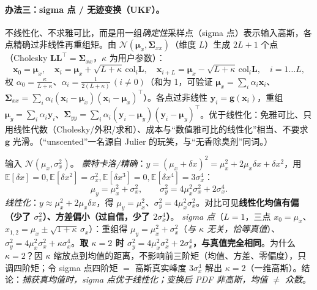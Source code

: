 \paragraph{办法三：sigma 点 / 无迹变换（UKF）。}
不线性化、不求雅可比，而是用一组\emph{确定性}采样点（sigma 点）表示输入高斯，各点精确过非线性再重组矩\cite{barfoot2024state}。由 $\mathcal{N}(\boldsymbol{\mu}_x,\boldsymbol{\Sigma}_{xx})$（维度 $L$）生成 $2L+1$ 个点（Cholesky $\mathbf{L}\mathbf{L}^\top=\boldsymbol{\Sigma}_{xx}$，$\kappa$ 为用户参数）：
\begin{equation}
  \mathbf{x}_0=\boldsymbol{\mu}_x,\quad
  \mathbf{x}_i=\boldsymbol{\mu}_x+\sqrt{L+\kappa}\,\mathrm{col}_i\mathbf{L},\quad
  \mathbf{x}_{i+L}=\boldsymbol{\mu}_x-\sqrt{L+\kappa}\,\mathrm{col}_i\mathbf{L},\quad i=1\dots L,
  \label{eq:sigma-points}
\end{equation}
权 $\alpha_0=\tfrac{\kappa}{L+\kappa}$、$\alpha_i=\tfrac{1}{2(L+\kappa)}\,(i\ne0)$（和为 1，可验证 $\boldsymbol{\mu}_x=\sum_i\alpha_i\mathbf{x}_i$、$\boldsymbol{\Sigma}_{xx}=\sum_i\alpha_i(\mathbf{x}_i-\boldsymbol{\mu}_x)(\mathbf{x}_i-\boldsymbol{\mu}_x)^\top$）。各点过非线性 $\mathbf{y}_i=\mathbf{g}(\mathbf{x}_i)$，重组 $\boldsymbol{\mu}_y=\sum_i\alpha_i\mathbf{y}_i$、$\boldsymbol{\Sigma}_{yy}=\sum_i\alpha_i(\mathbf{y}_i-\boldsymbol{\mu}_y)(\mathbf{y}_i-\boldsymbol{\mu}_y)^\top$。优于线性化：免雅可比、只用线性代数（Cholesky/外积/求和）、成本与“数值雅可比的线性化”相当、不要求 $\mathbf{g}$ 光滑。（“unscented”一名源自 Julier 的玩笑，与“无香除臭剂”同词\cite{barfoot2024state}。）

\begin{example}[$f(x)=x^2$：三法对比，看清线性化为何过自信]\label{ex:three-methods}
输入 $\mathcal{N}(\mu_x,\sigma_x^2)$。
\emph{蒙特卡洛/精确}：$y=(\mu_x+\delta x)^2=\mu_x^2+2\mu_x\delta x+\delta x^2$，用 $\mathbb{E}[\delta x]=0,\mathbb{E}[\delta x^2]=\sigma_x^2,\mathbb{E}[\delta x^3]=0,\mathbb{E}[\delta x^4]=3\sigma_x^4$：
\[
  \mu_y=\mu_x^2+\sigma_x^2,\qquad \sigma_y^2=4\mu_x^2\sigma_x^2+2\sigma_x^4.
\]
\emph{线性化}：$y\approx\mu_x^2+2\mu_x\delta x$，得 $\mu_y=\mu_x^2$、$\sigma_y^2=4\mu_x^2\sigma_x^2$。对比可见\textbf{线性化均值有偏（少了 $\sigma_x^2$）、方差偏小（过自信，少了 $2\sigma_x^4$）}。
\emph{sigma 点}（$L=1$，三点 $x_0=\mu_x$、$x_{1,2}=\mu_x\pm\sqrt{1+\kappa}\,\sigma_x$）：重组得 $\mu_y=\mu_x^2+\sigma_x^2$（\emph{与 $\kappa$ 无关，恰等真值}）、$\sigma_y^2=4\mu_x^2\sigma_x^2+\kappa\sigma_x^4$。\textbf{取 $\kappa=2$ 时 $\sigma_y^2=4\mu_x^2\sigma_x^2+2\sigma_x^4$，与真值完全相同}。为什么 $\kappa=2$？因 $\kappa$ 缩放点到均值的距离，不影响前三阶矩（均值、方差、零偏度），只调四阶矩；令 sigma 点四阶矩 $=$ 高斯真实峰度 $3\sigma_x^4$ 解出 $\kappa=2$（一维高斯）。结论：\emph{捕获真均值时，sigma 点优于线性化；变换后 PDF 非高斯，均值 $\ne$ 众数}。
\end{example}

